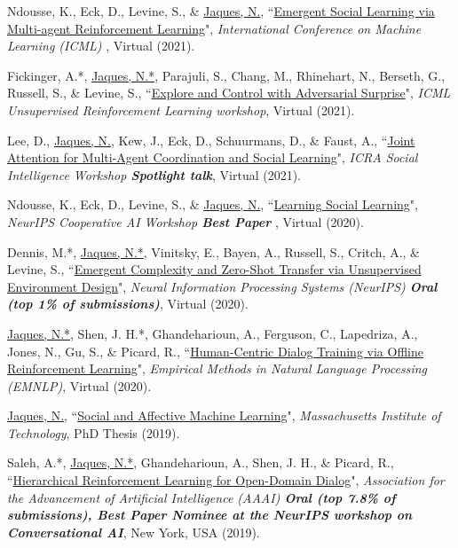 \documentclass[paper=letter,fontsize=11pt]{scrartcl} %
\newcommand{\PaperEntry}[6]{
		\noindent #1, ``\href{#6}{#2}", \textit{#3}, #4 (#5).}
\begin{document}
\begin{etaremune}
\item \PaperEntry{Ndousse, K., Eck, D., Levine, S., \& \underline{Jaques, N.}}{Emergent Social Learning via Multi-agent Reinforcement Learning}{International Conference on Machine Learning (ICML) }{Virtual}{2021}{https://arxiv.org/abs/2010.00581}

\item \PaperEntry{Fickinger, A.*, \underline{Jaques, N.*}, Parajuli, S., Chang, M., Rhinehart, N., Berseth, G., Russell, S., \& Levine, S.}{Explore and Control with Adversarial Surprise}{ICML Unsupervised Reinforcement Learning workshop}{Virtual}{2021}{https://arxiv.org/abs/2107.07394}

\item \PaperEntry{Lee, D., \underline{Jaques, N.}, Kew, J., Eck, D., Schuurmans, D., \& Faust, A.}{Joint Attention for Multi-Agent Coordination and Social Learning}{ICRA Social Intelligence Workshop \textbf{Spotlight talk}}{Virtual}{2021}{https://arxiv.org/abs/2104.07750}

\item \PaperEntry{Ndousse, K., Eck, D., Levine, S., \& \underline{Jaques, N.}}{Learning Social Learning}{NeurIPS Cooperative AI Workshop \textbf{Best Paper} }{Virtual}{2020}{https://arxiv.org/abs/2010.00581}

\item \PaperEntry{Dennis, M.*, \underline{Jaques, N.*}, Vinitsky, E., Bayen, A., Russell, S., Critch, A., \& Levine, S.}{Emergent Complexity and Zero-Shot Transfer via Unsupervised Environment Design}{Neural Information Processing Systems (NeurIPS) \textbf{Oral (top 1\% of submissions)}}{Virtual}{2020}{https://arxiv.org/abs/2012.02096}

\item \PaperEntry{\underline{Jaques, N.*}, Shen, J. H.*, Ghandeharioun, A., Ferguson, C., Lapedriza, A., Jones, N., Gu, S., \& Picard, R.}{Human-Centric Dialog Training via Offline Reinforcement Learning}{Empirical Methods in Natural Language Processing (EMNLP)}{Virtual}{2020}{https://arxiv.org/pdf/2010.05848.pdf}

\item \PaperEntry{\underline{Jaques, N.}}{Social and Affective Machine Learning}{Massachusetts Institute of Technology}{PhD Thesis}{2019}{https://www.media.mit.edu/publications/social-and-affective-machine-learning/}

\item \PaperEntry{Saleh, A.*, \underline{Jaques, N.*}, Ghandeharioun, A., Shen, J. H., \& Picard, R.}{Hierarchical Reinforcement Learning for Open-Domain Dialog}{Association for the Advancement of Artificial Intelligence (AAAI) \textbf{Oral (top 7.8\% of submissions), Best Paper Nominee at the NeurIPS workshop on Conversational AI}}{New York, USA}{2019}{https://arxiv.org/abs/1909.07547}


\end{etaremune}
\end{document}
